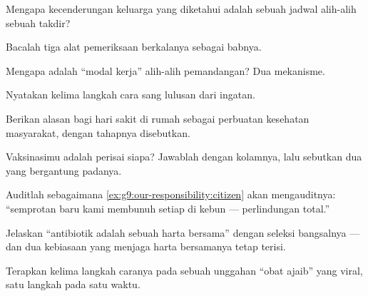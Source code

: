 \begin{exercise}[$\star$]\label{exo:g9:our-responsibility:3}
Mengapa kecenderungan keluarga yang diketahui adalah sebuah
jadwal alih-alih sebuah takdir?
\end{exercise}

\begin{exercise}[$\star$]\label{exo:g9:our-responsibility:4}
Bacalah tiga alat pemeriksaan berkalanya sebagai babnya.
\end{exercise}

\begin{exercise}[$\star$]\label{exo:g9:our-responsibility:5}
Mengapa  adalah ``modal kerja''
alih-alih pemandangan? Dua mekanisme.
\end{exercise}

\begin{exercise}[$\star$]\label{exo:g9:our-responsibility:6}
Nyatakan kelima langkah cara sang lulusan dari ingatan.
\end{exercise}

\begin{exercise}[$\star\star$]\label{exo:g9:our-responsibility:7}
Berikan alasan bagi hari sakit di rumah sebagai perbuatan
kesehatan masyarakat, dengan tahapnya disebutkan.
\end{exercise}

\begin{exercise}[$\star\star$]\label{exo:g9:our-responsibility:8}
Vaksinasimu adalah perisai siapa? Jawablah dengan kolamnya,
lalu sebutkan dua yang bergantung padanya.
\end{exercise}

\begin{exercise}[$\star\star$]\label{exo:g9:our-responsibility:9}
Auditlah sebagaimana \cref{ex:g9:our-responsibility:citizen}
akan mengauditnya: ``semprotan baru kami membunuh setiap
 di kebun  --- perlindungan total.''
\end{exercise}

\begin{exercise}[$\star\star$]\label{exo:g9:our-responsibility:10}
Jelaskan ``antibiotik adalah sebuah harta bersama'' dengan
seleksi bangsalnya --- dan dua kebiasaan yang menjaga harta
bersamanya tetap terisi.
\end{exercise}

\begin{exercise}[$\star\star$]\label{exo:g9:our-responsibility:11}
Terapkan kelima langkah caranya pada sebuah unggahan ``obat
ajaib'' yang viral, satu langkah pada satu waktu.
\end{exercise}

